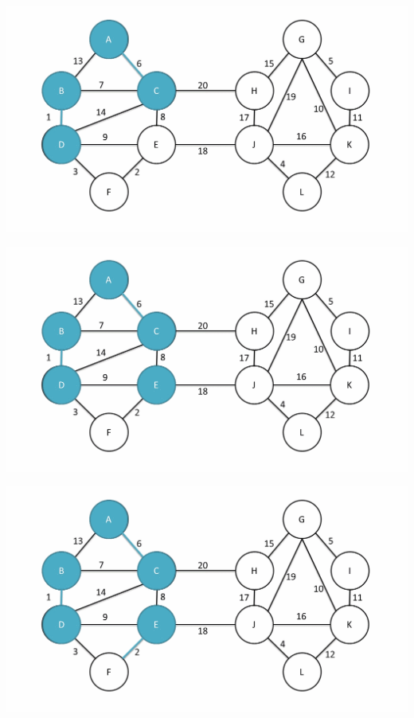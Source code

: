 \documentclass[
	11pt, %
]{beamer}
\begin{document}
\begin{frame}
    \includegraphics[width = 1\textwidth]{baruvka-example/frame_06_delay-2s.png}
\end{frame}
\begin{frame}
    \includegraphics[width = 1\textwidth]{baruvka-example/frame_07_delay-1s.png}
\end{frame}
\begin{frame}
    \includegraphics[width = 1\textwidth]{baruvka-example/frame_08_delay-1s.png}
\end{frame}
\end{document}
